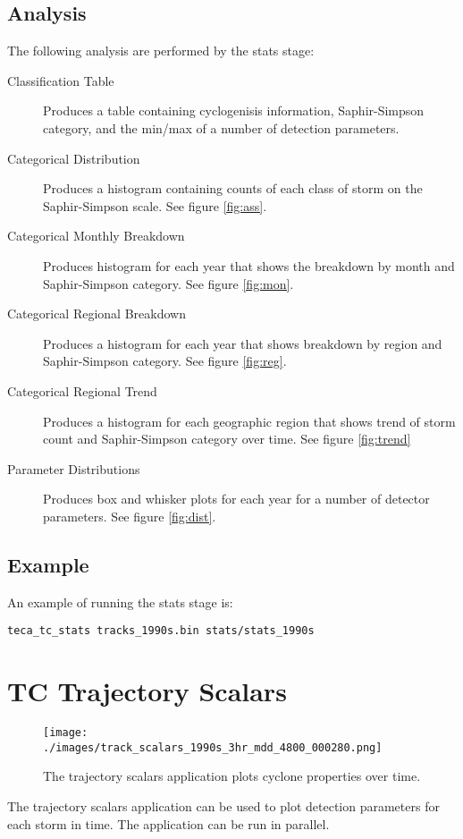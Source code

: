 \documentclass[a4paper,10pt,DIV=12]{scrreprt}
\begin{document}
\subsection{Analysis}
\noindent The following analysis are performed by the stats stage:
\begin{description}
\item[Classification Table] Produces a table containing cyclogenisis information, Saphir-Simpson category, and the min/max of a number of detection parameters.
\item[Categorical Distribution] Produces a histogram containing counts of each class of storm on the Saphir-Simpson scale. See figure \ref{fig:ass}.
\item[Categorical Monthly Breakdown] Produces histogram for each year that shows the breakdown by month and Saphir-Simpson category. See figure \ref{fig:mon}.
\item[Categorical Regional Breakdown] Produces a histogram for each year that shows breakdown by region and Saphir-Simpson category. See figure \ref{fig:reg}.
\item[Categorical Regional Trend] Produces a histogram for each geographic region that shows trend of storm count and Saphir-Simpson category over time. See figure \ref{fig:trend}
\item[Parameter Distributions] Produces box and whisker plots for each year for a number of detector parameters. See figure \ref{fig:dist}.
\end{description}

\subsection{Example}
\noindent An example of running the stats stage is:
\begin{verbatim}
teca_tc_stats tracks_1990s.bin stats/stats_1990s
\end{verbatim}

\section{TC Trajectory Scalars}
\begin{wrapfigure}{r}{0.5\textwidth}
 \centering
 \texttt{[image: ./images/track\_scalars\_1990s\_3hr\_mdd\_4800\_000280.png]}
 \caption{The trajectory scalars application plots cyclone properties over time.}
 \label{fig:traj_scalar}
 \vspace{-110pt}
\end{wrapfigure}
The trajectory scalars application can be used to plot detection parameters for each storm in time. The application can be run in parallel.
\end{document}
